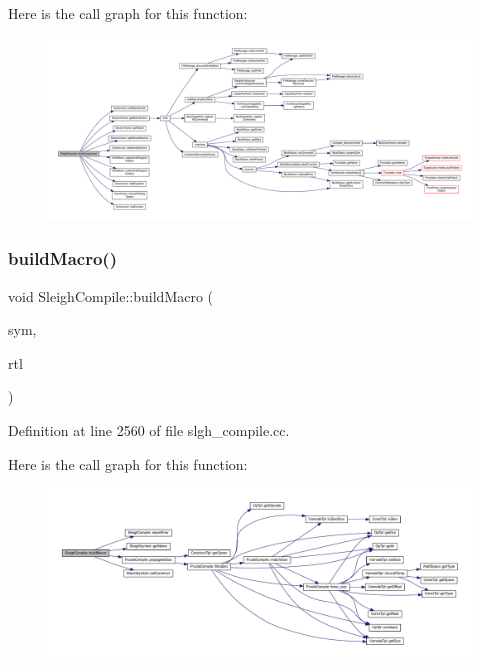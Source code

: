Here is the call graph for this function\+:
\nopagebreak
\begin{figure}[H]
\begin{center}
\leavevmode
\includegraphics[width=350pt]{class_sleigh_compile_a2d11b92b6c5db7386b319ad88202c2b2_cgraph}
\end{center}
\end{figure}
\mbox{\label{class_sleigh_compile_af1254837779064d42c7d575f30b66b68}} 
\subsubsection{\texorpdfstring{buildMacro()}{buildMacro()}}
{\footnotesize\ttfamily void Sleigh\+Compile\+::build\+Macro (\begin{DoxyParamCaption}\item[{\mbox{\hyperlink{class_macro_symbol}{Macro\+Symbol}} $\ast$}]{sym,  }\item[{\mbox{\hyperlink{class_construct_tpl}{Construct\+Tpl}} $\ast$}]{rtl }\end{DoxyParamCaption})}



Definition at line 2560 of file slgh\+\_\+compile.\+cc.

Here is the call graph for this function\+:
\nopagebreak
\begin{figure}[H]
\begin{center}
\leavevmode
\includegraphics[width=350pt]{class_sleigh_compile_af1254837779064d42c7d575f30b66b68_cgraph}
\end{center}
\end{figure}
\mbox{\label{class_sleigh_compile_abf73e7515a8035b45682451849f2b5be}} 
